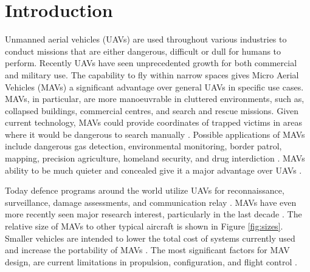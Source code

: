 \graphicspath{{./Figs/}}

\chapter{Introduction} 
\label{sec:Background}




Unmanned aerial vehicles (\acrshort{UAV}s) are used throughout various industries to conduct missions that are either dangerous, difficult or dull for humans to perform. Recently \acrshort{UAV}s have seen unprecedented growth for both commercial \cite{Liu2014} and military \cite{Chaturvedi2019, Fan2018} use. The capability to fly within narrow spaces gives Micro Aerial Vehicles (\acrshort{MAV}s) a significant advantage over general \acrshort{UAV}s in specific use cases. \acrshort{MAV}s, in particular, are more manoeuvrable in cluttered environments, such as, collapsed buildings, commercial centres, and search and rescue missions. Given current technology, \acrshort{MAV}s could provide coordinates of trapped victims in areas where it would be dangerous to search manually \cite{Valavanis2007}. Possible applications of \acrshort{MAV}s include dangerous gas detection, environmental monitoring, border patrol, mapping, precision agriculture, homeland security, and drug interdiction \cite{Liu2014, Valavanis2007}. \acrshort{MAV}s ability to be much quieter and concealed give it a major advantage over \acrshort{UAV}s \cite{Chaturvedi2019}.


Today defence programs around the world utilize \acrshort{UAV}s for reconnaissance, surveillance, damage assessments, and communication relay \cite{Chaturvedi2019, Fan2018, Valavanis2007}. \acrshort{MAV}s have even more recently seen major research interest, particularly in the last decade \cite{Valavanis2007}.  The relative size of \acrshort{MAV}s to other typical aircraft is shown in Figure \ref{fig:sizes}. Smaller vehicles are intended to lower the total cost of systems currently used and increase the portability of \acrshort{MAV}s \cite{Stephen2022}. The most significant factors for \acrshort{MAV} design, are current limitations in propulsion, configuration, and flight control \cite{Stephen2022}.


